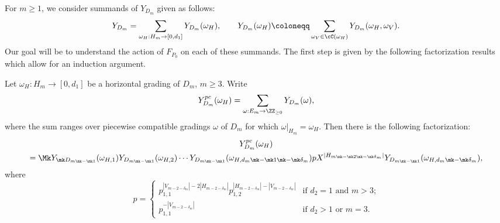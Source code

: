 For $m\ge1$, we consider summands of $Y_{D_m}$ given as follows:
\begin{equation}
 \label{eq:Y decomposition}
 Y_{D_m}=\sum_{\omega_H:H_m\to[0,d_1]}Y_{D_m}(\omega_H),\qquad Y_{D_m}(\omega_H)\coloneqq \sum_{\omega_V\in\cC(\omega_H)}Y_{D_m}(\omega_H,\omega_V).
\end{equation}
Our goal will be to understand the action of $F_{P_0}$ on each of these summands.
The first step is given by the following factorization results which allow for an induction argument.
\begin{lemma}
 \label{le:piecewise compatible factorization 1}
 Let $\omega_H:H_m\to[0,d_1]$ be a horizontal grading of $D_m$, $m\ge3$.
 Write 
 \[Y_{D_m}^{pc}(\omega_H)=\sum\limits_{\omega:E_m\to\ZZ_{\ge0}}Y_{D_m}(\omega),\]
 where the sum ranges over piecewise compatible gradings $\omega$ of $D_m$ for which $\omega|_{H_m}=\omega_H$.
 Then there is the following factorization:
 \begin{multline}
 \label{eq:piecewise compatible factorization 1}
 Y_{D_m}^{pc}(\omega_H)\\
 =\Mk Y_{\mk D_{m\mk -\mk 1}}(\omega_{H,1})Y_{D_{m\mk -\mk 1}}(\omega_{H,2})\cdots Y_{D_{m\mk -\mk 1}}(\omega_{H,d_m\mk -\mk 1\mk -\mk \delta_m})pX^{|H_{m\mk -\mk 2\mk -\mk \delta_m}|} Y_{D_{m\mk -\mk 1}}(\omega_{H,d_m\mk -\mk \delta_m}),
 \end{multline}
 where 
 \[p=\begin{cases} p_{1,1}^{|V_{m-2-\delta_m}|-2|H_{m-2-\delta_m}|}p_{1,2}^{|H_{m-2-\delta_m}|-|V_{m-2-\delta_m}|} & \text{if $d_2=1$ and $m>3$;}\\ p_{1,1}^{-|V_{m-2-\delta_m}|} & \text{if $d_2>1$ or $m=3$.}\end{cases}\]
\end{lemma}
